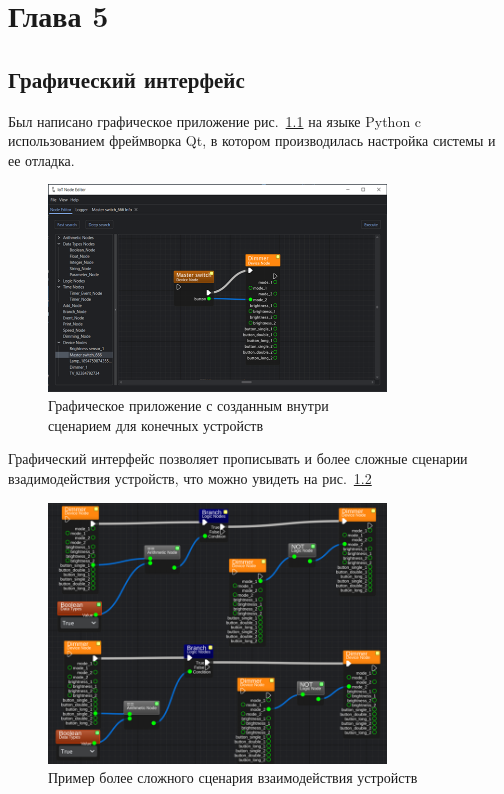 \documentclass[14pt, a4paper]{extreport}
\begin{document}
\newpage

\chapter{Глава 5}

\section{Графический интерфейс}
Был написано графическое приложение рис.~\ref{fig:GUI_base} на языке Python c использованием фреймворка Qt, в котором производилась настройка системы и ее отладка.

\begin{figure}[ht]
    \centering
    \includegraphics[width=0.8\textwidth]{images/Fig11.png}
    \captionsetup{justification=centering}
    \caption{Графическое приложение с созданным внутри\\сценарием для конечных устройств}
    \label{fig:GUI_base}
\end{figure}

Графический интерфейс позволяет прописывать и более сложные сценарии взадимодействия устройств, что можно увидеть на рис.~\ref{fig:GUI_adv}

\begin{figure}[ht]
    \centering
    \includegraphics[width=0.8\textwidth]{images/Fig12.png}
    \caption{Пример более сложного сценария взаимодействия устройств}
    \label{fig:GUI_adv}
\end{figure}
\end{document}
